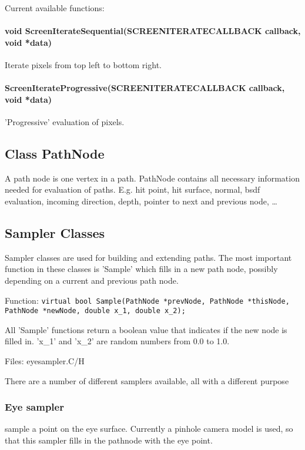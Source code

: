 \documentclass[11pt]{report}
\begin{document}
Current available functions:

\paragraph{void ScreenIterateSequential(SCREENITERATECALLBACK callback, void *data)}

Iterate pixels from top left to bottom right.

\paragraph{ScreenIterateProgressive(SCREENITERATECALLBACK callback, 
			      void *data)}

'Progressive' evaluation of pixels. 


\subsection{Class PathNode}

A path node is one vertex in a path. PathNode contains
all necessary information needed for evaluation of paths.
E.g. hit point, hit surface, normal, bsdf evaluation,
incoming direction, depth, pointer to next and previous node, \ldots

\subsection{Sampler Classes}

Sampler classes are used for building and extending paths.
The most important function in these classes is 'Sample'
which fills in a new path node, possibly depending on a
current and previous path node.

Function:
{\tt virtual bool Sample(PathNode *prevNode, PathNode *thisNode,
  PathNode *newNode, double x\_1, double x\_2); }


All 'Sample' functions return a boolean value that indicates if
the new node is filled in. 'x\_1' and 'x\_2' are random numbers from
0.0 to 1.0.

Files: eyesampler.C/H


There are a number of different samplers available, all with
a different purpose


\subsubsection{Eye sampler}

sample a point on the eye surface. Currently a pinhole
camera model is used, so that this sampler fills in the pathnode
with the eye point.
\end{document}
